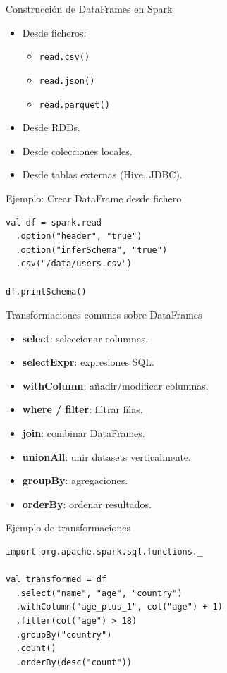 \documentclass{beamer}
\begin{document}
\begin{frame}{Construcción de DataFrames en Spark}
\begin{itemize}
  \item Desde ficheros:
  \begin{itemize}
    \item \texttt{read.csv()}
    \item \texttt{read.json()}
    \item \texttt{read.parquet()}
  \end{itemize}
  \item Desde RDDs.
  \item Desde colecciones locales.
  \item Desde tablas externas (Hive, JDBC).
\end{itemize}
\end{frame}

\begin{frame}[fragile]{Ejemplo: Crear DataFrame desde fichero}
\begin{verbatim}
val df = spark.read
  .option("header", "true")
  .option("inferSchema", "true")
  .csv("/data/users.csv")

df.printSchema()
\end{verbatim}
\end{frame}

\begin{frame}{Transformaciones comunes sobre DataFrames}
\begin{itemize}
  \item \textbf{select}: seleccionar columnas.
  \item \textbf{selectExpr}: expresiones SQL.
  \item \textbf{withColumn}: añadir/modificar columnas.
  \item \textbf{where / filter}: filtrar filas.
  \item \textbf{join}: combinar DataFrames.
  \item \textbf{unionAll}: unir datasets verticalmente.
  \item \textbf{groupBy}: agregaciones.
  \item \textbf{orderBy}: ordenar resultados.
\end{itemize}
\end{frame}

\begin{frame}[fragile]{Ejemplo de transformaciones}
\begin{verbatim}
import org.apache.spark.sql.functions._

val transformed = df
  .select("name", "age", "country")
  .withColumn("age_plus_1", col("age") + 1)
  .filter(col("age") > 18)
  .groupBy("country")
  .count()
  .orderBy(desc("count"))
\end{verbatim}
\end{frame}
\end{document}
